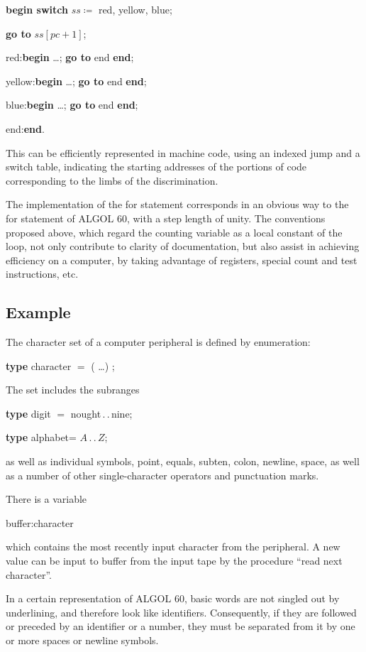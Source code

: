 \quad \textbf{begin switch} $ss \coloneq$ red, yellow, blue;

\quad \quad \textbf{go to} $ss[pc + 1]$;

\quad \quad red:\textbf{begin} \dots; \textbf{go to} end \textbf{end};

\quad \quad yellow:\textbf{begin} \dots; \textbf{go to} end \textbf{end};

\quad \quad blue:\textbf{begin} \dots; \textbf{go to} end \textbf{end};

\quad end:\textbf{end}. 

This can be efficiently represented in machine code, using an indexed jump and a switch table, indicating the starting addresses of the portions of code corresponding to the limbs of the discrimination.

The implementation of the for statement corresponds in an obvious way to the for statement of ALGOL 60, with a step length of unity. The conventions proposed above, which regard the counting variable as a local constant of the loop, not only contribute to clarity of documentation, but also assist in achieving efficiency on a computer, by taking advantage of registers, special count and test instructions, etc.

\subsection{Example}
\label{sec:example-3-3}

The character set of a computer peripheral is defined by enumeration:

\quad \textbf{type} character $=$ ( \dots ) ;

\noindent
The set includes the subranges

\quad \textbf{type} digit $=$ nought\,.\,.\,nine;

\quad \textbf{type} alphabet= $A\,.\,.\,Z$;

\noindent
as well as individual symbols, point, equals, subten, colon, newline, space, as well as a number of other single-character operators and punctuation marks.

There is a variable

\quad buffer:character 

\noindent
which contains the most recently input character from the peripheral. A new value can be input to buffer from the input tape by the procedure ``read next character''.

In a certain representation of ALGOL 60, basic words are not singled out by underlining, and therefore look like identifiers. Consequently, if they are followed or preceded by an identifier or a number, they must be separated from it by one or more spaces or newline symbols.

